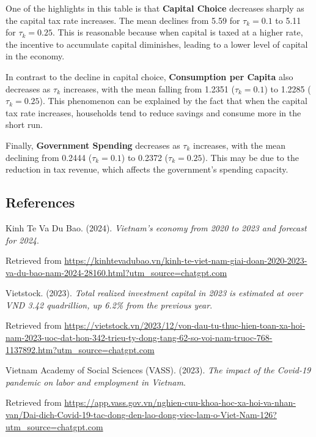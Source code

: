 \documentclass{article}
\begin{document}
One of the highlights in this table is that \textbf{Capital Choice} decreases sharply as the capital tax rate increases. The mean declines from 5.59 for \(\tau_k = 0.1\) to 5.11 for \(\tau_k = 0.25\). This is reasonable because when capital is taxed at a higher rate, the incentive to accumulate capital diminishes, leading to a lower level of capital in the economy.

In contrast to the decline in capital choice, \textbf{Consumption per Capita} also decreases as \(\tau_k\) increases, with the mean falling from 1.2351 (\(\tau_k = 0.1\)) to 1.2285 (\(\tau_k = 0.25\)). This phenomenon can be explained by the fact that when the capital tax rate increases, households tend to reduce savings and consume more in the short run.

Finally, \textbf{Government Spending} decreases as \(\tau_k\) increases, with the mean declining from 0.2444 (\(\tau_k = 0.1\)) to 0.2372 (\(\tau_k = 0.25\)). This may be due to the reduction in tax revenue, which affects the government's spending capacity.

\newpage
\begin{center}
    \section*{References}
\end{center}

Kinh Te Va Du Bao. (2024). \textit{Vietnam's economy from 2020 to 2023 and forecast for 2024}.  

Retrieved from \url{https://kinhtevadubao.vn/kinh-te-viet-nam-giai-doan-2020-2023-va-du-bao-nam-2024-28160.html?utm_source=chatgpt.com}

\vspace{1em}

Vietstock. (2023). \textit{Total realized investment capital in 2023 is estimated at over VND 3.42 quadrillion, up 6.2\% from the previous year}.  

Retrieved from \url{https://vietstock.vn/2023/12/von-dau-tu-thuc-hien-toan-xa-hoi-nam-2023-uoc-dat-hon-342-trieu-ty-dong-tang-62-so-voi-nam-truoc-768-1137892.htm?utm_source=chatgpt.com}

\vspace{1em}

Vietnam Academy of Social Sciences (VASS). (2023). \textit{The impact of the Covid-19 pandemic on labor and employment in Vietnam}.  

Retrieved from \url{https://app.vass.gov.vn/nghien-cuu-khoa-hoc-xa-hoi-va-nhan-van/Dai-dich-Covid-19-tac-dong-den-lao-dong-viec-lam-o-Viet-Nam-126?utm_source=chatgpt.com}
\end{document}
